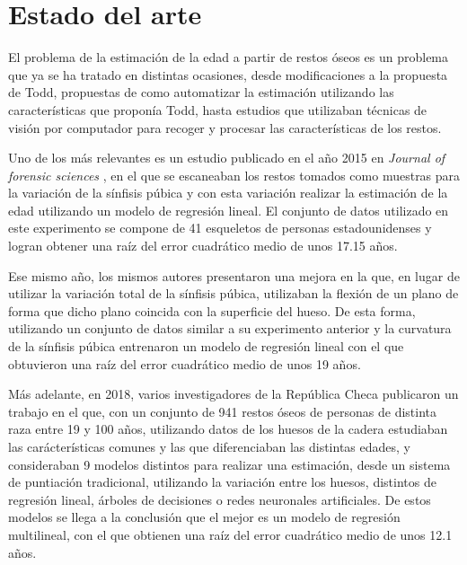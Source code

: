 \section{Estado del arte}

El problema de la estimación de la edad a partir de restos óseos es un problema que ya se ha tratado en distintas ocasiones, desde modificaciones a la propuesta de Todd, propuestas de como automatizar la estimación utilizando las características que proponía Todd, hasta estudios que utilizaban técnicas de visión por computador para recoger y procesar las características de los restos.

Uno de los más relevantes es un estudio publicado en el año 2015 en \textit{Journal of forensic sciences} \cite{modelandoHuesos3D}, en el que se escaneaban los restos tomados como muestras para la variación de la sínfisis púbica y con esta variación realizar la estimación de la edad utilizando un modelo de regresión lineal. El conjunto de datos utilizado en este experimento se compone de 41 esqueletos de personas estadounidenses y logran obtener una raíz del error cuadrático medio de unos 17.15 años.

Ese mismo año, los mismos autores presentaron una mejora \cite{mejoraModelandoHuesos3D} en la que, en lugar de utilizar la variación total de la sínfisis púbica, utilizaban la flexión de un plano de forma que dicho plano coincida con la superficie del hueso. De esta forma, utilizando un conjunto de datos similar a su experimento anterior y la curvatura de la sínfisis púbica entrenaron un modelo de regresión lineal con el que obtuvieron una raíz del error cuadrático medio de unos 19 años.


Más adelante, en 2018, varios investigadores de la República Checa publicaron un trabajo \cite{estimacionHuesosCadera} en el que, con un conjunto de 941 restos óseos de personas de distinta raza entre 19 y 100 años, utilizando datos de los huesos de la cadera estudiaban las carácterísticas comunes y las que diferenciaban las distintas edades, y consideraban 9 modelos distintos para realizar una estimación, desde un sistema de puntiación tradicional, utilizando la variación entre los huesos, distintos de regresión lineal, árboles de decisiones o redes neuronales artificiales. De estos modelos se llega a la conclusión que el mejor es un modelo de regresión multilineal, con el que obtienen una raíz del error cuadrático medio de unos 12.1 años.
